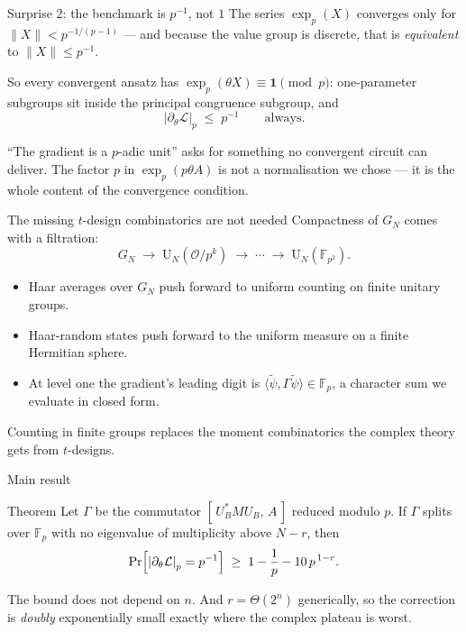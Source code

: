 \documentclass[aspectratio=169,10pt]{beamer}
\newcommand{\OK}{\mathcal{O}}
\newcommand{\FF}{\mathbb{F}}
\newcommand{\Uni}{\mathrm{U}}
\newcommand{\Id}{\mathbf{1}}
\newcommand{\loss}{\mathcal{L}}
\newcommand{\padicnorm}[1]{\left|#1\right|_p}
\newcommand{\inner}[2]{\langle #1, #2\rangle}
\begin{document}
\begin{frame}{Surprise 2: the benchmark is $p^{-1}$, not $1$}
  The series $\exp_p(X)$ converges only for $\|X\|<p^{-1/(p-1)}$ --- and
  because the value group is discrete, that is \emph{equivalent} to
  $\|X\|\le p^{-1}$.

  \vspace{0.5em}
  So every convergent ansatz has
  $\exp_p(\theta X)\equiv\Id \pmod{p}$: one-parameter subgroups sit inside the
  principal congruence subgroup, and
  \[
    \padicnorm{\partial_\theta\loss}\;\le\;p^{-1}
    \qquad\text{always.}
  \]

  \vspace{0.3em}
  ``The gradient is a $p$-adic unit'' asks for something \alert{no convergent
  circuit can deliver}. The factor $p$ in $\exp_p(p\theta A)$ is not a
  normalisation we chose --- it is the whole content of the convergence
  condition.
\end{frame}

\begin{frame}{The missing $t$-design combinatorics are not needed}
  Compactness of $G_N$ comes with a filtration:
  \[
    G_N \;\longrightarrow\; \Uni_N(\OK/p^{k})
    \;\longrightarrow\;\cdots\;\longrightarrow\;
    \Uni_N(\FF_{p^{2}}).
  \]

  \begin{itemize}
    \item Haar averages over $G_N$ push forward to \alert{uniform counting} on
      finite unitary groups.
    \item Haar-random states push forward to the uniform measure on a finite
      Hermitian sphere.
    \item At level one the gradient's leading digit is
      $\inner{\tilde\psi}{\Gamma\tilde\psi}\in\FF_p$, a
      \alert{character sum} we evaluate in closed form.
  \end{itemize}

  \vspace{0.4em}
  Counting in finite groups replaces the moment combinatorics the complex
  theory gets from $t$-designs.
\end{frame}

\begin{frame}{Main result}
  \begin{alertblock}{Theorem}
    Let $\Gamma$ be the commutator $[\,U_B^{*}MU_B,\,A\,]$ reduced modulo $p$.
    If $\Gamma$ splits over $\FF_p$ with no eigenvalue of multiplicity above
    $N-r$, then
    \[
      \Pr\Bigl[\padicnorm{\partial_\theta\loss}=p^{-1}\Bigr]
      \;\ge\;1-\frac1p-10\,p^{\,1-r}.
    \]
  \end{alertblock}

  \vspace{0.3em}
  The bound does \alert{not depend on $n$}. And $r=\Theta(2^{n})$ generically,
  so the correction is \emph{doubly} exponentially small exactly where the
  complex plateau is worst.
\end{frame}
\end{document}
